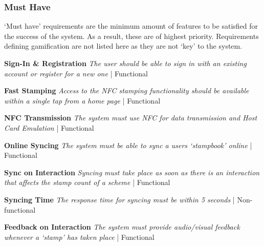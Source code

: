 \subsubsection{Must Have}
`Must have' requirements are the minimum amount of features to be satisfied for the success of the system. As a result, these are of highest priority. Requirements defining gamification are not listed here as they are not `key' to the system.
\begin{description}[leftmargin=!,labelwidth=\widthof{\bfseries Medium}]
    \item[M1] \textbf{Sign-In \& Registration} \newline
        \textit{The user should be able to sign in with an existing account or register for a new one}  | Functional
        
    \item[M2] \textbf{Fast Stamping} \newline
        \textit{Access to the NFC stamping functionality should be available within a single tap from a home page}  | Functional
    
    \item[M3] \textbf{NFC Transmission} \newline
        \textit{The system must use NFC for data transmission and Host Card Emulation}  | Functional
        
    \item[M4] \textbf{Online Syncing} \newline
        \textit{The system must be able to sync a users `stampbook' online}  | Functional
        
    \item[M5] \textbf{Sync on Interaction} \newline
        \textit{Syncing must take place as soon as there is an interaction that affects the stamp count of a scheme}  | Functional
        
    \item[M6] \textbf{Syncing Time} \newline
        \textit{The response time for syncing must be within 5 seconds}  | Non-functional  
        
    \item[M7] \textbf{Feedback on Interaction} \newline
        \textit{The system must provide audio/visual feedback whenever a `stamp' has taken place}  | Functional
        
\end{description}

